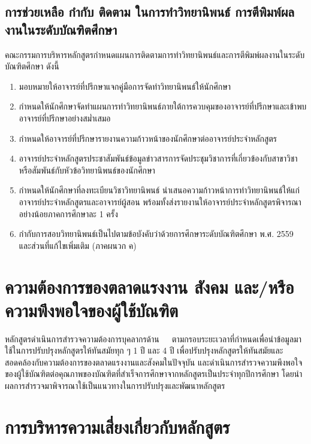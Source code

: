   \subsection{การช่วยเหลือ กำกับ ติดตาม ในการทำวิทยานิพนธ์ การตีพิมพ์ผลงานในระดับบัณฑิตศึกษา} 
  คณะกรรมการบริหารหลักสูตรกำหนดแผนการติดตามการทำวิทยานิพนธ์และการตีพิมพ์ผลงานในระดับบัณฑิตศึกษา ดังนี้ 
 \begin{enumerate}
   	\item มอบหมายให้อาจารย์ที่ปรึกษาแจกคู่มือการจัดทำวิทยานิพนธ์ให้นักศึกษา   
   	\item กำหนดให้นักศึกษาจัดทำแผนการทำวิทยานิพนธ์ภายใต้การควบคุมของอาจารย์ที่ปรึกษาและเข้าพบอาจารย์ที่ปรึกษาอย่างสม่ำเสมอ
   	\item กำหนดให้อาจารย์ที่ปรึกษารายงานความก้าวหน้าของนักศึกษาต่ออาจารย์ประจำหลักสูตร  	  
   	\item อาจารย์ประจำหลักสูตรประชาสัมพันธ์ข้อมูลข่าวสารการจัดประชุมวิชาการที่เกี่ยวข้องกับสาขาวิชาหรือสัมพันธ์กับหัวข้อวิทยานิพนธ์ของนักศึกษา
   	\item กำหนดให้นักศึกษาที่ลงทะเบียนวิชาวิทยานิพนธ์ นำเสนอความก้าวหน้าการทำวิทยานิพนธ์ให้แก่อาจารย์ประจำหลักสูตรและอาจารย์ผู้สอน พร้อมทั้งส่งรายงานให้อาจารย์ประจำหลักสูตรพิจารณาอย่างน้อยภาคการศึกษาละ 1 ครั้ง  	
   	\item  กำกับการสอบวิทยานิพนธ์เป็นไปตามข้อบังคับ\university ว่าด้วยการศึกษาระดับบัณฑิตศึกษา พ.ศ. 2559 และส่วนที่แก้ไขเพิ่มเติม (ภาคผนวก ค)   	 \end{enumerate}   
   
\section{ความต้องการของตลาดแรงงาน สังคม และ/หรือความพึงพอใจของผู้ใช้บัณฑิต}
หลักสูตรดำเนินการสำรวจความต้องการบุคลากรด้าน\thdegreebranch \,\,\,\,\,\,\,\,\,ตามกรอบระยะเวลาที่กำหนดเพื่อนำข้อมูลมาใช้ในการปรับปรุงหลักสูตรให้ทันสมัยทุก ๆ 1 ปี และ 4 ปี เพื่อปรับปรุงหลักสูตรให้ทันสมัยและสอดคล้องกับความต้องการของตลาดแรงงานและสังคมในปัจจุบัน และดำเนินการสำรวจความพึงพอใจของผู้ใช้บัณฑิตต่อคุณภาพของบัณฑิตที่สำเร็จการศึกษาจากหลักสูตรเป็นประจำทุกปีการศึกษา โดยนำผลการสำรวจมาพิจารณาใช้เป็นแนวทางในการปรับปรุงและพัฒนาหลักสูตร


\section{การบริหารความเสี่ยงเกี่ยวกับหลักสูตร}
